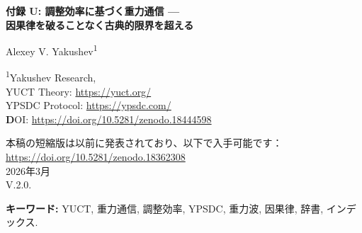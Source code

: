 \documentclass[12pt,a4paper]{article}
\newcommand{\Keff}{K_{\mathrm{eff}}}
\begin{document}
	
	\begin{titlepage}
		\begin{center}
			\vspace*{1cm}
			\Huge \textbf{付録 U: 調整効率に基づく重力通信 — \\ 因果律を破ることなく古典的限界を超える}
			
			\vspace{1cm}
			\Large Alexey V. Yakushev\textsuperscript{1}
			
			\vspace{0.5cm}
			\large \textsuperscript{1}Yakushev Research, \\
			YUCT Theory: \url{https://yuct.org/}\\
			YPSDC Protocol: \url{https://ypsdc.com/}\\
			
			\vspace{2cm}
			\textbf DOI: \url{https://doi.org/10.5281/zenodo.18444598}\\
			
			\vspace{1cm}
			
			\vspace{0cm}
			\large 
			本稿の短縮版は以前に発表されており、以下で入手可能です：\\ \url{https://doi.org/10.5281/zenodo.18362308}\\
			\vspace{1cm}
			2026年3月 \\ \large V.2.0.
			
			\newpage
			\vspace{2cm}
			\begin{abstract}
				\noindent
				我々は、ヤクシェフ統一調整理論（YUCT）に基づいた長距離通信の新しいアプローチを提案する。重力場を自然に存在するグローバルな辞書として扱うことにより、短いインデックス（重力摂動）が遠隔の観測者間で状態を調整できることを示す。その有効効率 \(\Keff\) は形式的に光速の限界を超えるが、因果律には違反しない。鍵は、オフラインでの辞書配布（事前に存在する重力場）とオンラインでのインデックス伝送（光速の重力波）の分離にある。重力波は物質を減衰なく透過し、電磁信号に対して大きな利点を提供する。我々は基礎方程式を導出し、達成可能な効率を見積もり、高精度重力計を用いた実験的検証を提案する。この研究は、遅延が距離ではなく局所処理によって決定される新しい種類の通信システムへの道を開く。
			\end{abstract}
			
			\vspace{0.5cm}
			\noindent \textbf{キーワード:} YUCT, 重力通信, 調整効率, YPSDC, 重力波, 因果律, 辞書, インデックス.
		\end{center}
	\end{titlepage}
	
\end{document}
